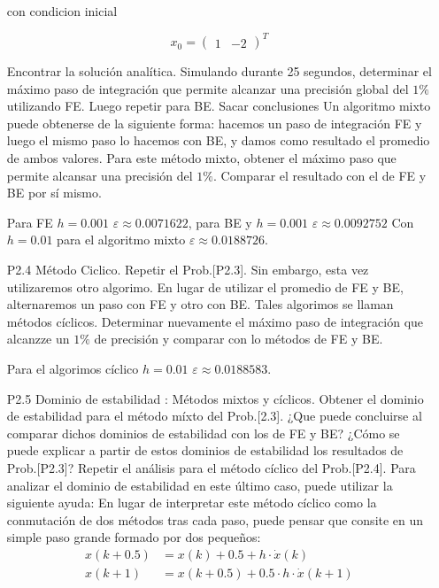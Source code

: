 \documentclass{article}
\begin{document}
\begin{itemize}
con condicion inicial

\begin{equation}
x_0 = \begin{pmatrix} 1 & -2\end{pmatrix}^T
 \label{P2.3b} \tag{P2.3b}
\end{equation}

Encontrar la solución analítica. Simulando durante 25 segundos, determinar el máximo paso de integración que permite alcanzar una precisión global del $1\%$ utilizando FE. Luego repetir para BE. Sacar conclusiones
Un algoritmo mixto puede obtenerse de la siguiente forma: hacemos un paso de integración FE y luego el mismo paso lo hacemos con BE, y damos como resultado el promedio de ambos valores. Para este método mixto, obtener el máximo paso que permite alcansar una precisión del $1\%$. Comparar el resultado con el de FE y BE por sí mismo.

Para FE $h = 0.001$ $\varepsilon \approx 0.0071622$, para BE y $h = 0.001$ $\varepsilon \approx 0.0092752 $ 
Con $h = 0.01$ para el algoritmo mixto $\varepsilon \approx 0.0188726$.
\item[P2.4] Método Ciclico. Repetir el Prob.[P2.3]. Sin embargo, esta vez utilizaremos otro algorimo. En lugar de utilizar el promedio de FE y BE, alternaremos un paso con FE y otro con BE. Tales algorimos se llaman métodos cíclicos.
Determinar nuevamente el máximo paso de integración que alcanzze un $1\%$ de precisión y comparar con lo métodos de FE y BE.

Para el algorimos cíclico $h = 0.01$ $\varepsilon \approx 0.0188583$.

\item[P2.5] Dominio de estabilidad : Métodos mixtos y cíclicos. Obtener el dominio de estabilidad para el método míxto del Prob.[2.3]. ¿Que puede concluirse al comparar dichos dominios de estabilidad con los de FE y BE? ¿Cómo se puede explicar a partir de estos dominios de estabilidad los resultados de Prob.[P2.3]?
Repetir el análisis para el método cíclico del Prob.[P2.4]. Para analizar el dominio de estabilidad en este último caso, puede utilizar la siguiente ayuda:
En lugar de interpretar este método cíclico como la conmutación de dos métodos tras cada paso, puede pensar que consite en un simple paso grande formado por dos pequeños:
\begin{align}
	x(k+0.5) &= x(k) + 0.5 + h \cdot \dot{x}(k) \tag{P2.5a} \\
	x(k+1)   &= x(k + 0.5) + 0.5 \cdot h \cdot \dot{x}(k+1) \tag{P2.5b}
\end{align}


\end{itemize}
\end{document}
